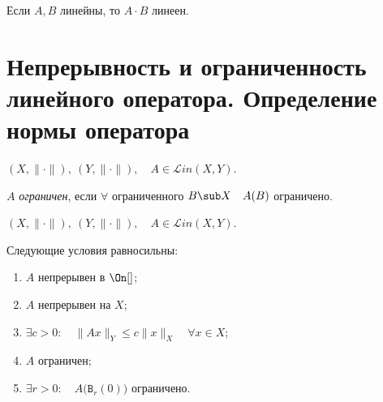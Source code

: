 \begin{statement}
	Если $ A, B $ линейны, то $ A \cdot B $ линеен.
\end{statement}


\section{Непрерывность и ограниченность линейного оператора.
Определение нормы оператора}

\begin{definition}
	$ (X, \|\cdot\|), ~ (Y, \|\cdot\|), \quad A \in \mathscr Lin(X, Y) $.

	$ A $ \emph{ограничен}, если $ \forall $ ограниченного $ B \sub X \quad A(B) $ ограничено.
\end{definition}

\begin{theorem}
	$ (X, \|\cdot\|), ~ (Y, \|\cdot\|), \quad A \in \mathscr Lin(X, Y) $.

	Следующие условия равносильны:
	\begin{enumerate}
		\item $ A $ непрерывен в $ \On[] $;
		\item $ A $ непрерывен на $ X $;
		\item $ \exists c > 0 : \quad \|Ax\|_Y \le c\|x\|_X \quad \forall x \in X $;
		\item $ A $ ограничен;
		\item $ \exists r > 0 : \quad A \bigl( \mathtt B_r(0) \bigr) $ ограничено.
	\end{enumerate}
\end{theorem}

